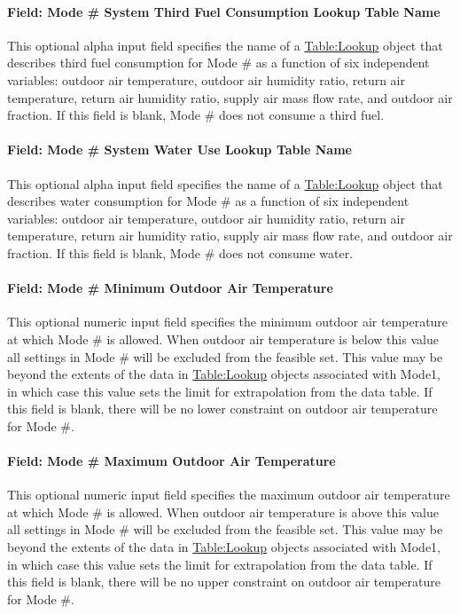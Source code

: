 \paragraph{Field: Mode \# System Third Fuel Consumption Lookup Table Name}
This optional alpha input field specifies the name of a \hyperref[tablelookup]{Table:Lookup} object that describes third fuel consumption for Mode \# as a function of six independent variables: outdoor air temperature, outdoor air humidity ratio, return air temperature, return air humidity ratio, supply air mass flow rate, and outdoor air fraction. If this field is blank, Mode \# does not consume a third fuel.

\paragraph{Field: Mode \# System Water Use Lookup Table Name}
This optional alpha input field specifies the name of a \hyperref[tablelookup]{Table:Lookup} object that describes water consumption for Mode \# as a function of six independent variables: outdoor air temperature, outdoor air humidity ratio, return air temperature, return air humidity ratio, supply air mass flow rate, and outdoor air fraction. If this field is blank, Mode \# does not consume water.

\paragraph{Field: Mode \# Minimum Outdoor Air Temperature}
This optional numeric input field specifies the minimum outdoor air temperature at which Mode \# is allowed. When outdoor air temperature is below this value all settings in Mode \# will be excluded from the feasible set. This value may be beyond the extents of the  data in \hyperref[tablelookup]{Table:Lookup} objects associated with Mode1, in which case this value sets the limit for extrapolation from the data table. If this field is blank, there will be no lower constraint on outdoor air temperature for Mode \#.

\paragraph{Field: Mode \# Maximum Outdoor Air Temperature}
This optional numeric input field specifies the maximum outdoor air temperature at which Mode \# is allowed. When outdoor air temperature is above this value all settings in Mode \# will be excluded from the feasible set. This value may be beyond the extents of the  data in \hyperref[tablelookup]{Table:Lookup} objects associated with Mode1, in which case this value sets the limit for extrapolation from the data table. If this field is blank, there will be no upper constraint on outdoor air temperature for Mode \#.

